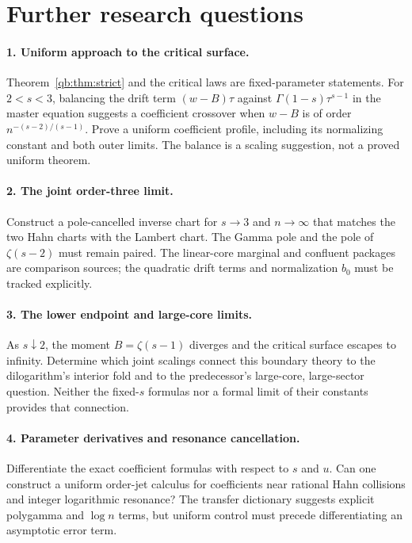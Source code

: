 \documentclass[11pt,a4paper]{article}
\theoremstyle{definition}\newtheorem{definition}[theorem]{Definition}
\theoremstyle{remark}\newtheorem{remark}[theorem]{Remark}
\numberwithin{equation}{section}
\begin{document}
\section{Further research questions}\label{qb:sec:future}

\paragraph{1. Uniform approach to the critical surface.}
Theorem~\ref{qb:thm:strict} and the critical laws are fixed-parameter
statements. For $2<s<3$, balancing the drift term
$(w-B)\tau$ against $\Gamma(1-s)\tau^{s-1}$ in the master equation
suggests a coefficient crossover when
$w-B$ is of order $n^{-(s-2)/(s-1)}$. Prove a uniform coefficient profile,
including its normalizing constant and both outer limits. The balance is
a scaling suggestion, not a proved uniform theorem.

\paragraph{2. The joint order-three limit.}
Construct a pole-cancelled inverse chart for $s\to3$ and $n\to\infty$
that matches the two Hahn charts with the Lambert chart. The Gamma pole
and the pole of $\zeta(s-2)$ must remain paired. The linear-core marginal
and confluent packages are comparison sources; the quadratic drift terms
and normalization $b_0$ must be tracked explicitly.

\paragraph{3. The lower endpoint and large-core limits.}
As $s\downarrow2$, the moment $B=\zeta(s-1)$ diverges and the critical
surface escapes to infinity. Determine which joint scalings connect this
boundary theory to the dilogarithm's interior fold and to the predecessor's
large-core, large-sector question. Neither the fixed-$s$ formulas nor a
formal limit of their constants provides that connection.

\paragraph{4. Parameter derivatives and resonance cancellation.}
Differentiate the exact coefficient formulas with respect to $s$ and
$u$. Can one construct a uniform order-jet calculus for coefficients near
rational Hahn collisions and integer logarithmic resonance? The transfer
dictionary suggests explicit polygamma and $\log n$ terms, but uniform
control must precede differentiating an asymptotic error term.
\end{document}
